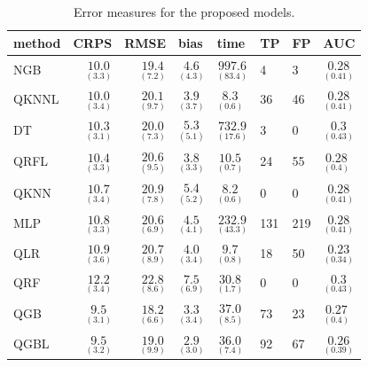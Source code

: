 \documentclass[a4paper,3p,sort&compress]{elsarticle}
\begin{document}
\begin{table}[tbp]
  \centering \footnotesize
  \caption{\label{tab:determ}Error measures for the proposed models.}
    \begin{tabular}{lrrlllll}
      \toprule
         method &              CRPS &              RMSE &             bias &                time &  TP &  FP &                AUC \\
        \midrule
            NGB &  $ \underset{(3.3)}{10.0} $ &  $ \underset{(7.2)}{19.4} $ &  $ \underset{(4.3)} {4.6}$ & $ \underset{(83.4)}  {997.6}$  &   4 &   3 & $ \underset{(0.41)} {0.28}$  \\
          QKNNL &  $ \underset{(3.4)}{10.0} $ &  $ \underset{(9.7)}{20.1} $ &  $ \underset{(3.7)} {3.9}$ & $ \underset{(0.6)}     {8.3}$  &  36 &  46 & $ \underset{(0.41)} {0.28}$  \\
             DT &  $ \underset{(3.1)}{10.3} $ &  $ \underset{(7.3)}{20.0} $ &  $ \underset{(5.1)} {5.3}$ & $ \underset{(17.6)}  {732.9}$  &   3 &   0 & $ \underset{(0.43)}  {0.3}$  \\
           QRFL &  $ \underset{(3.3)}{10.4} $ &  $ \underset{(9.5)}{20.6} $ &  $ \underset{(3.3)} {3.8}$ & $ \underset{(0.7)}    {10.5}$  &  24 &  55 & $ \underset{(0.4)}  {0.28}$  \\
           QKNN &  $ \underset{(3.4)}{10.7} $ &  $ \underset{(7.8)}{20.9} $ &  $ \underset{(5.2)} {5.4}$ & $ \underset{(0.6)}     {8.2}$  &   0 &   0 & $ \underset{(0.41)} {0.28}$  \\
            MLP &  $ \underset{(3.3)}{10.8} $ &  $ \underset{(6.9)}{20.6} $ &  $ \underset{(4.1)} {4.5}$ & $ \underset{(43.3)}  {232.9}$  & 131 & 219 & $ \underset{(0.41)} {0.28}$  \\
            QLR &  $ \underset{(3.6)}{10.9} $ &  $ \underset{(8.9)}{20.7} $ &  $ \underset{(3.4)} {4.0}$ & $ \underset{(0.8)}     {9.7}$  &  18 &  50 & $ \underset{(0.34)} {0.23}$  \\
            QRF &  $ \underset{(3.4)}{12.2} $ &  $ \underset{(8.6)}{22.8} $ &  $ \underset{(6.9)} {7.5}$ & $ \underset{(1.7)}    {30.8}$  &   0 &   0 & $ \underset{(0.43)}  {0.3}$  \\
            QGB &  $ \underset{(3.1)}{9.5}  $ &  $ \underset{(6.6)}{18.2} $ &  $ \underset{(3.4)} {3.3}$ & $ \underset{(8.5)}    {37.0}$  &  73 &  23 & $ \underset{(0.4)}  {0.27}$  \\
           QGBL &  $ \underset{(3.2)}{9.5}  $ &  $ \underset{(9.9)}{19.0} $ &  $ \underset{(3.0)} {2.9}$ & $ \underset{(7.4)}    {36.0}$  &  92 &  67 & $ \underset{(0.39)} {0.26}$  \\
       \bottomrule
      \end{tabular}
\end{table}
\end{document}
